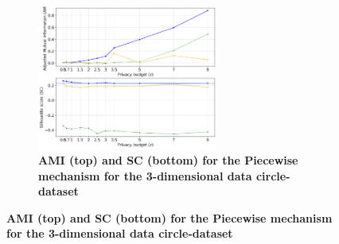 \begin{figure}[H]
\begin{subfigure}{1\textwidth}
        \caption{\textbf{AMI (top) and SC (bottom) for the Piecewise mechanism for the 3-dimensional data circle-dataset}}
        \centering
        \includegraphics[width=0.65\textwidth]{Results/kd-laplace/piecewise/circle-dataset/ami-and-sc_3_dimensions.png}
    \end{subfigure}
    \label{fig:validation-circle-dataset_comparison_3d-laplace}
\end{figure}
\newpage
